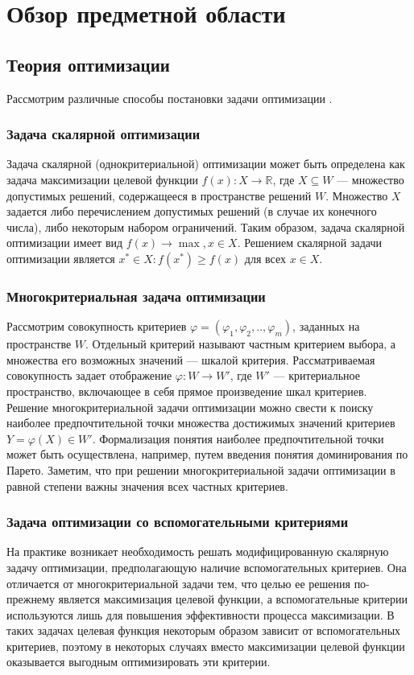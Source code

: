 \chapter{Обзор предметной области}
\label{chapter1}

\section{Теория оптимизации}
\label{optimization}

Рассмотрим различные способы постановки задачи оптимизации \cite{criteries, multievol, multicriteria, optimize}.
\subsection{Задача скалярной оптимизации}
Задача скалярной (однокритериальной) оптимизации может быть определена как задача максимизации
целевой функции $f(x): X\rightarrow \mathbb{R}$, где $X\subseteq W$ --- множество допустимых решений, содержащееся в пространстве решений $W$. Множество $X$ задается либо перечислением допустимых решений (в случае их конечного числа), либо некоторым набором ограничений. Таким образом, задача скалярной оптимизации имеет вид $f(x)\rightarrow\max, x\in X$. Решением скалярной задачи оптимизации является $x^*\in X: f(x^*)\geq f(x)$ для всех $x\in X$.

\subsection{Многокритериальная задача оптимизации}
Рассмотрим совокупность критериев $\varphi=(\varphi_1,\varphi_2,..,\varphi_m)$, заданных на пространстве $W$.  Отдельный критерий называют частным критерием выбора, а множества его возможных значений --- шкалой критерия. Рассматриваемая совокупность задает отображение $\varphi:W\rightarrow W'$, где $W'$ --- критериальное пространство, включающее в себя прямое произведение шкал критериев. Решение многокритериальной задачи оптимизации можно свести к поиску наиболее предпочтительной точки множества достижимых значений критериев $Y=\varphi(X)\in W'$. Формализация понятия наиболее предпочтительной точки может быть осуществлена, например, путем введения понятия доминирования по Парето. Заметим, что при решении многокритериальной задачи оптимизации в равной степени важны значения всех частных критериев.

\subsection{Задача оптимизации со вспомогательными критериями}
На практике возникает необходимость решать модифицированную скалярную задачу оптимизации, предполагающую наличие вспомогательных критериев. Она отличается от многокритериальной задачи тем, что целью ее решения по-прежнему является максимизация целевой функции, а вспомогательные критерии используются лишь для повышения эффективности процесса максимизации. В таких задачах целевая функция некоторым образом зависит от вспомогательных критериев, поэтому в некоторых случаях вместо максимизации целевой функции оказывается выгодным оптимизировать эти критерии.

